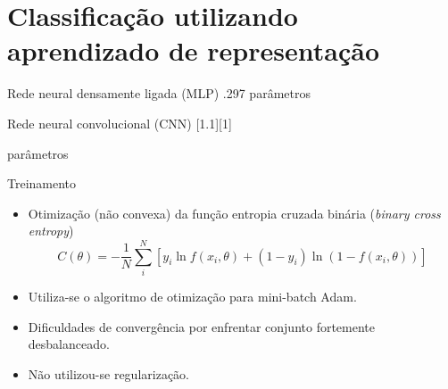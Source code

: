 \section{Classificação utilizando aprendizado de representação}

\begin{frame}{Rede neural densamente ligada (MLP)}
	\vspace{-30pt}
	.297 parâmetros
\end{frame}

\begin{frame}{Rede neural convolucional (CNN)}
	[1.1][1]

	\vspace{-30pt}
	 parâmetros
\end{frame}


\begin{frame}{Treinamento}
	\begin{itemize}
	\item Otimização (não convexa) da função entropia cruzada binária (\textit{binary cross entropy})
	\begin{equation*}
	C(\theta) = -\frac{1}{N} \sum_i^N \left[y_i \ln f(x_i,\theta) + (1-y_i) \ln (1-f(x_i,\theta))\right]
	\end{equation*}

	\item Utiliza-se o algoritmo de otimização para mini-batch Adam.
	\item Dificuldades de convergência por enfrentar conjunto fortemente desbalanceado.
	\item Não utilizou-se regularização.
	\end{itemize}
\end{frame}

